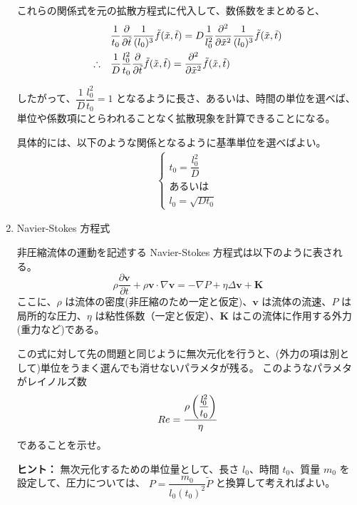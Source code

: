 \documentclass[uplatex,dvipdfmx,a4paper,11pt]{jsarticle}
\newcommand{\difp}[2]{\dfrac{\partial #1}{\partial #2}}
\newcommand{\difpp}[2]{\dfrac{\partial^2 #1}{\partial #2^2}}
\begin{document}
\begin{enumerate}
これらの関係式を元の拡散方程式に代入して、数係数をまとめると、
\begin{align*}
&\dfrac{1}{t_0} \difp{}{\tilde{t}} \dfrac{1}{(l_0)^3} \tilde{f}(\tilde{x}, \tilde{t}) = D \dfrac{1}{l_0^2} \difpp{}{\tilde{x}} \dfrac{1}{(l_0)^3} \tilde{f}(\tilde{x}, \tilde{t}) \notag \\
\therefore \quad &\dfrac{1}{D} \dfrac{l_0^2}{t_0} \difp{}{\tilde{t}} \tilde{f}(\tilde{x}, \tilde{t}) = \difpp{}{\tilde{x}} \tilde{f}(\tilde{x}, \tilde{t})
\end{align*}

したがって、$\dfrac{1}{D} \dfrac{l_0^2}{t_0} = 1$ となるように長さ、あるいは、時間の単位を選べば、単位や係数項にとらわれることなく拡散現象を計算できることになる。

具体的には、以下のような関係となるように基準単位を選べばよい。
\begin{align*}
\begin{cases}
t_0 = \dfrac{l_0^2}{D} \\
\text{あるいは} \\
l_0 = \sqrt{D t_0}
\end{cases}
\end{align*}


\newpage

\item
Navier-Stokes 方程式

非圧縮流体の運動を記述する Navier-Stokes 方程式は以下のように表される。
\begin{equation*}
\rho\dfrac{\partial \bm{v}}{\partial t} + \rho \bm{v} \cdot \nabla \bm{v} = - \nabla P + \eta \Delta \bm{v} + \bm{K}
\end{equation*}
ここに、$\rho$ は流体の密度(非圧縮のため一定と仮定)、$\bm{v}$ は流体の流速、$P$ は局所的な圧力、$\eta$ は粘性係数（一定と仮定）、$\bm{K}$ はこの流体に作用する外力(重力など)である。

この式に対して先の問題と同じように無次元化を行うと、(外力の項は別として)単位をうまく選んでも消せないパラメタが残る。
このようなパラメタがレイノルズ数
\begin{equation*}
Re = \dfrac{\rho \left(\dfrac{{\it l}_0^2}{t_0} \right)}{\eta}
\end{equation*}
であることを示せ。

\begin{itembox}[l]{{\bf ヒント：}}
無次元化するための単位量として、長さ $l_0$、時間 $t_0$、質量 $m_0$ を設定して、圧力については、 
$P = \dfrac{m_0}{l_0 (t_0)^2} \tilde{P}$ と換算して考えればよい。


\end{itembox}
\end{enumerate}
\end{document}
